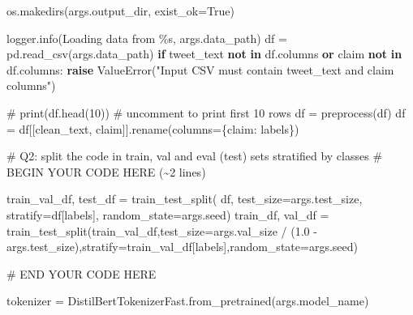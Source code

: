 \documentclass[
  letterpaper,
  DIV=11,
  numbers=noendperiod]{scrartcl}
\newenvironment{Shaded}{\begin{snugshade}}{\end{snugshade}}
\newcommand{\CommentTok}[1]{\textcolor[rgb]{0.37,0.37,0.37}{#1}}
\newcommand{\ControlFlowTok}[1]{\textcolor[rgb]{0.00,0.23,0.31}{\textbf{#1}}}
\newcommand{\FloatTok}[1]{\textcolor[rgb]{0.68,0.00,0.00}{#1}}
\newcommand{\KeywordTok}[1]{\textcolor[rgb]{0.00,0.23,0.31}{\textbf{#1}}}
\newcommand{\NormalTok}[1]{\textcolor[rgb]{0.00,0.23,0.31}{#1}}
\newcommand{\OperatorTok}[1]{\textcolor[rgb]{0.37,0.37,0.37}{#1}}
\newcommand{\PreprocessorTok}[1]{\textcolor[rgb]{0.68,0.00,0.00}{#1}}
\newcommand{\RegionMarkerTok}[1]{\textcolor[rgb]{0.00,0.23,0.31}{#1}}
\newcommand{\SpecialCharTok}[1]{\textcolor[rgb]{0.37,0.37,0.37}{#1}}
\newcommand{\StringTok}[1]{\textcolor[rgb]{0.13,0.47,0.30}{#1}}
\newcommand{\VariableTok}[1]{\textcolor[rgb]{0.07,0.07,0.07}{#1}}
\begin{document}
\begin{Shaded}
\begin{Highlighting}[]
\NormalTok{    os.makedirs(args.output\_dir, exist\_ok}\OperatorTok{=}\VariableTok{True}\NormalTok{)}

\NormalTok{    logger.info(}\StringTok{\textquotesingle{}Loading data from }\SpecialCharTok{\%s}\StringTok{\textquotesingle{}}\NormalTok{, args.data\_path)}
\NormalTok{    df }\OperatorTok{=}\NormalTok{ pd.read\_csv(args.data\_path)}
    \ControlFlowTok{if} \StringTok{\textquotesingle{}tweet\_text\textquotesingle{}} \KeywordTok{not} \KeywordTok{in}\NormalTok{ df.columns }\KeywordTok{or} \StringTok{\textquotesingle{}claim\textquotesingle{}} \KeywordTok{not} \KeywordTok{in}\NormalTok{ df.columns:}
        \ControlFlowTok{raise} \PreprocessorTok{ValueError}\NormalTok{(}\StringTok{"Input CSV must contain \textquotesingle{}tweet\_text\textquotesingle{} and \textquotesingle{}claim\textquotesingle{} columns"}\NormalTok{)}

    \CommentTok{\# print(df.head(10)) \# uncomment to print first 10 rows}
\NormalTok{    df }\OperatorTok{=}\NormalTok{ preprocess(df)}
\NormalTok{    df }\OperatorTok{=}\NormalTok{ df[[}\StringTok{\textquotesingle{}clean\_text\textquotesingle{}}\NormalTok{, }\StringTok{\textquotesingle{}claim\textquotesingle{}}\NormalTok{]].rename(columns}\OperatorTok{=}\NormalTok{\{}\StringTok{\textquotesingle{}claim\textquotesingle{}}\NormalTok{: }\StringTok{\textquotesingle{}labels\textquotesingle{}}\NormalTok{\})}

    \CommentTok{\# Q2: split the code in train, val and eval (test) sets stratified by classes}
    \CommentTok{\# }\RegionMarkerTok{BEGIN}\CommentTok{ YOUR CODE HERE (\textasciitilde{}2 lines)}

\NormalTok{    train\_val\_df, test\_df }\OperatorTok{=}\NormalTok{ train\_test\_split(}
\NormalTok{    df, test\_size}\OperatorTok{=}\NormalTok{args.test\_size, stratify}\OperatorTok{=}\NormalTok{df[}\StringTok{\textquotesingle{}labels\textquotesingle{}}\NormalTok{], random\_state}\OperatorTok{=}\NormalTok{args.seed)}
\NormalTok{    train\_df, val\_df }\OperatorTok{=}\NormalTok{ train\_test\_split(train\_val\_df,test\_size}\OperatorTok{=}\NormalTok{args.val\_size }\OperatorTok{/}\NormalTok{ (}\FloatTok{1.0} \OperatorTok{{-}}\NormalTok{ args.test\_size),stratify}\OperatorTok{=}\NormalTok{train\_val\_df[}\StringTok{\textquotesingle{}labels\textquotesingle{}}\NormalTok{],random\_state}\OperatorTok{=}\NormalTok{args.seed)}
    
    \CommentTok{\# }\RegionMarkerTok{END}\CommentTok{ YOUR CODE HERE}

\NormalTok{    tokenizer }\OperatorTok{=}\NormalTok{ DistilBertTokenizerFast.from\_pretrained(args.model\_name)}


\end{Highlighting}
\end{Shaded}
\end{document}
